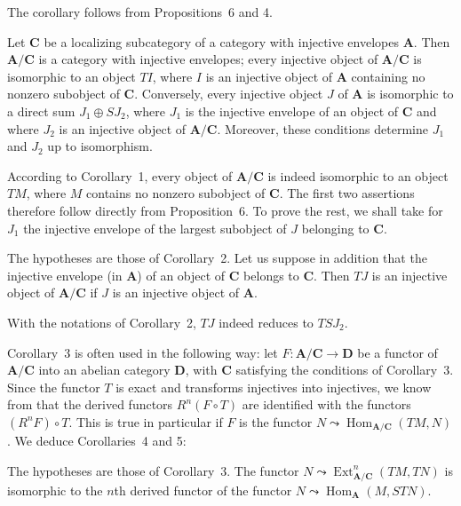 The corollary follows from Propositions~6 and 4.

\begin{corollary}
Let $\mathbf{C}$ be a localizing subcategory of a category with injective
envelopes $\mathbf{A}$. Then $\mathbf{A}/\mathbf{C}$ is a category with
injective envelopes; every injective object of $\mathbf{A}/\mathbf{C}$ is
isomorphic to an object $TI$, where $I$ is an injective object of
$\mathbf{A}$ containing no nonzero subobject of $\mathbf{C}$.
Conversely, every injective object $J$ of $\mathbf{A}$ is isomorphic to a
direct sum $J_1\oplus SJ_2$, where $J_1$ is the injective envelope of an
object of $\mathbf{C}$ and where $J_2$ is an injective object of
$\mathbf{A}/\mathbf{C}$. Moreover, these conditions determine $J_1$ and
$J_2$ up to isomorphism.
\end{corollary}

According to Corollary~1, every object of $\mathbf{A}/\mathbf{C}$ is
indeed isomorphic to an object $TM$, where $M$ contains no nonzero
subobject of $\mathbf{C}$. The first two assertions therefore follow
directly from Proposition~6. To prove the rest, we shall take for $J_1$
the injective envelope of the largest subobject of $J$ belonging to
$\mathbf{C}$.

\begin{corollary}
The hypotheses are those of Corollary~2. Let us suppose in addition that
the injective envelope (in $\mathbf{A}$) of an object of $\mathbf{C}$
belongs to $\mathbf{C}$. Then $TJ$ is an injective object of
$\mathbf{A}/\mathbf{C}$ if $J$ is an injective object of $\mathbf{A}$.
\end{corollary}

With the notations of Corollary~2, $TJ$ indeed reduces to $TSJ_2$.

Corollary~3 is often used in the following way: let
$F\colon\mathbf{A}/\mathbf{C}\to\mathbf{D}$ be a functor of
$\mathbf{A}/\mathbf{C}$ into an abelian category $\mathbf{D}$, with
$\mathbf{C}$ satisfying the conditions of Corollary~3. Since the functor
$T$ is exact and transforms injectives into injectives, we know from \cite{grothendieck-1}
that the derived functors $R^{n}(F\circ T)$ are identified with the
functors $(R^{n}F)\circ T$. This is true in particular if $F$ is the
functor $N\leadsto\operatorname{Hom}_{\mathbf{A}/\mathbf{C}}(TM,N)$. We
deduce Corollaries~4 and 5:

\begin{corollary}
The hypotheses are those of Corollary~3. The functor
$N\leadsto\operatorname{Ext}^{n}_{\mathbf{A}/\mathbf{C}}(TM,TN)$ is
isomorphic to the $n$th derived functor of the functor
$N\leadsto\operatorname{Hom}_{\mathbf{A}}(M,STN)$.
\end{corollary}

